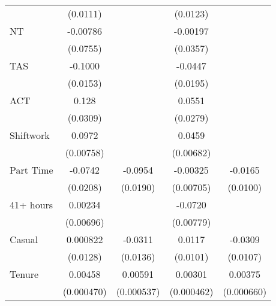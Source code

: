 {\begin{tabular}{l*{4}{c}}
                    &    (0.0111)         &                     &    (0.0123)         &                     \\
[1em]
NT                  &    -0.00786         &                     &    -0.00197         &                     \\
                    &    (0.0755)         &                     &    (0.0357)         &                     \\
[1em]
TAS                 &     -0.1000\sym{***}&                     &     -0.0447\sym{*}  &                     \\
                    &    (0.0153)         &                     &    (0.0195)         &                     \\
[1em]
ACT                 &       0.128\sym{***}&                     &      0.0551\sym{*}  &                     \\
                    &    (0.0309)         &                     &    (0.0279)         &                     \\
[1em]
Shiftwork           &      0.0972\sym{***}&                     &      0.0459\sym{***}&                     \\
                    &   (0.00758)         &                     &   (0.00682)         &                     \\
[1em]
Part Time           &     -0.0742\sym{***}&     -0.0954\sym{***}&    -0.00325         &     -0.0165         \\
                    &    (0.0208)         &    (0.0190)         &   (0.00705)         &    (0.0100)         \\
[1em]
41+ hours           &     0.00234         &                     &     -0.0720\sym{***}&                     \\
                    &   (0.00696)         &                     &   (0.00779)         &                     \\
[1em]
Casual              &    0.000822         &     -0.0311\sym{*}  &      0.0117         &     -0.0309\sym{**} \\
                    &    (0.0128)         &    (0.0136)         &    (0.0101)         &    (0.0107)         \\
[1em]
Tenure              &     0.00458\sym{***}&     0.00591\sym{***}&     0.00301\sym{***}&     0.00375\sym{***}\\
                    &  (0.000470)         &  (0.000537)         &  (0.000462)         &  (0.000660)         \\

\end{tabular}}
